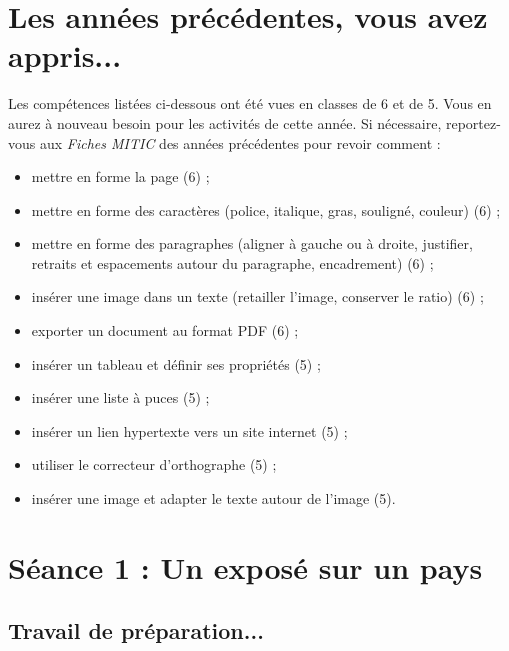 \section*{Les années précédentes, vous avez appris...} %

\vspace{12pt}

Les compétences listées ci-dessous ont été vues en classes de 6 et de 5. Vous en aurez à nouveau besoin pour les activités de cette année. Si nécessaire, reportez-vous aux \emph{Fiches MITIC} des années précédentes pour revoir comment :  

\begin{itemize}
\item mettre en forme la page (6) ;
\item mettre en forme des caractères (police, italique, gras, souligné, couleur) (6) ;
\item mettre en forme des paragraphes (aligner à gauche ou à droite, justifier, retraits et espacements autour du paragraphe, encadrement) (6) ;
\item insérer une image dans un texte (retailler l'image, conserver le ratio) (6) ;
\item exporter un document au format PDF (6) ;
\item insérer un tableau et définir ses propriétés (5) ;
\item insérer une liste à puces (5) ;
\item insérer un lien hypertexte vers un site internet (5) ;
\item utiliser le correcteur d'orthographe (5) ;
\item insérer une image et adapter le texte autour de l'image (5).
\end{itemize}





%
%
%
%


\section{Séance 1 : Un exposé sur un pays}\label{ficheTexte4e2}

\subsection{Travail de préparation...}

